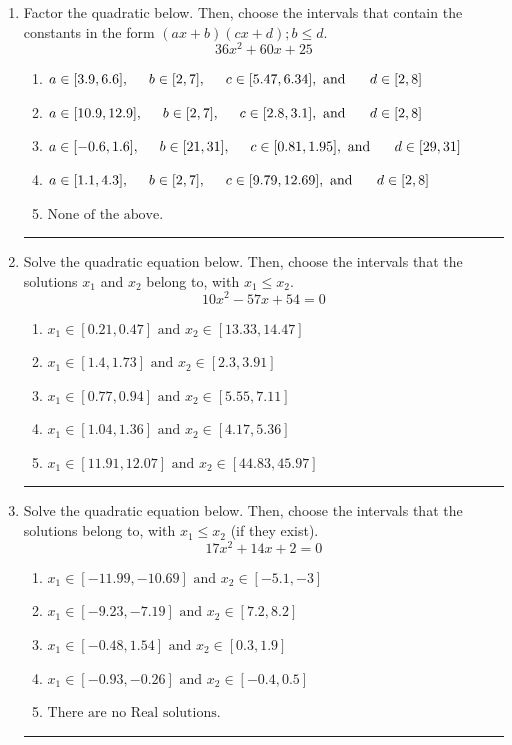 \documentclass[14pt]{extbook}
\newcommand{\litem}[1]{\item#1\hspace*{-1cm}\rule{\textwidth}{0.4pt}}
\begin{document}
\begin{enumerate}
{\begin{enumerate}[label=\Alph*.]
\end{enumerate} }
\litem{
Factor the quadratic below. Then, choose the intervals that contain the constants in the form $(ax+b)(cx+d); b \leq d.$\[ 36x^{2} +60 x + 25 \]\begin{enumerate}[label=\Alph*.]
\item \( a \in [3.9, 6.6], \hspace*{5mm} b \in [2, 7], \hspace*{5mm} c \in [5.47, 6.34], \text{ and } \hspace*{5mm} d \in [2, 8] \)
\item \( a \in [10.9, 12.9], \hspace*{5mm} b \in [2, 7], \hspace*{5mm} c \in [2.8, 3.1], \text{ and } \hspace*{5mm} d \in [2, 8] \)
\item \( a \in [-0.6, 1.6], \hspace*{5mm} b \in [21, 31], \hspace*{5mm} c \in [0.81, 1.95], \text{ and } \hspace*{5mm} d \in [29, 31] \)
\item \( a \in [1.1, 4.3], \hspace*{5mm} b \in [2, 7], \hspace*{5mm} c \in [9.79, 12.69], \text{ and } \hspace*{5mm} d \in [2, 8] \)
\item \( \text{None of the above.} \)

\end{enumerate} }
\litem{
Solve the quadratic equation below. Then, choose the intervals that the solutions $x_1$ and $x_2$ belong to, with $x_1 \leq x_2$.\[ 10x^{2} -57 x + 54 = 0 \]\begin{enumerate}[label=\Alph*.]
\item \( x_1 \in [0.21, 0.47] \text{ and } x_2 \in [13.33, 14.47] \)
\item \( x_1 \in [1.4, 1.73] \text{ and } x_2 \in [2.3, 3.91] \)
\item \( x_1 \in [0.77, 0.94] \text{ and } x_2 \in [5.55, 7.11] \)
\item \( x_1 \in [1.04, 1.36] \text{ and } x_2 \in [4.17, 5.36] \)
\item \( x_1 \in [11.91, 12.07] \text{ and } x_2 \in [44.83, 45.97] \)

\end{enumerate} }
\litem{
Solve the quadratic equation below. Then, choose the intervals that the solutions belong to, with $x_1 \leq x_2$ (if they exist).\[ 17x^{2} +14 x + 2 = 0 \]\begin{enumerate}[label=\Alph*.]
\item \( x_1 \in [-11.99, -10.69] \text{ and } x_2 \in [-5.1, -3] \)
\item \( x_1 \in [-9.23, -7.19] \text{ and } x_2 \in [7.2, 8.2] \)
\item \( x_1 \in [-0.48, 1.54] \text{ and } x_2 \in [0.3, 1.9] \)
\item \( x_1 \in [-0.93, -0.26] \text{ and } x_2 \in [-0.4, 0.5] \)
\item \( \text{There are no Real solutions.} \)


\end{enumerate}}
\end{enumerate}
\end{document}
